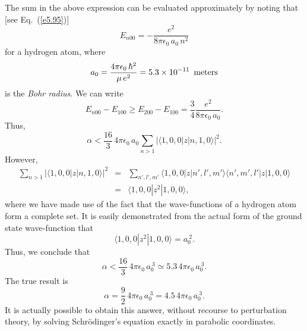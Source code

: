The sum in the above expression can be evaluated approximately by noting that
[see Eq.~(\ref{e5.95})]
\begin{equation}
E_{n00} = - \frac{e^2}{8\pi\epsilon_0\, a_0\,n^2} 
\end{equation}
for a hydrogen atom,
where
\begin{equation}
a_0 = \frac{4\pi \epsilon_0 \,\hbar^2}{\mu \,e^2} = 5.3\times 10^{-11}\,\,\,
{\rm meters}
\end{equation}
is the {\em Bohr radius}. We can write
\begin{equation}
E_{n00}-E_{100} \geq E_{200} - E_{100} = \frac{3}{4}
 \frac{e^2}{8\pi\epsilon_0\, a_0}.
\end{equation}
Thus, 
\begin{equation}
\alpha < \frac{16}{3}\, 4\pi \epsilon_0\, a_0  \sum_{n>1} 
|\langle 1,0,0|z|n,1,0\rangle|^2.
\end{equation}
However,
\begin{eqnarray}
\sum_{n>1} 
|\langle 1,0,0|z|n,1,0\rangle|^2& =& \sum_{n',l',m'}
\langle 1,0,0|z|n',l',m'\rangle\langle n',m',l'|z|1,0,0\rangle \nonumber\\[0.5ex]
&=& \langle 1,0,0|z^2|1,0,0\rangle,
\end{eqnarray}
where we have made use of the fact that the wave-functions of a hydrogen atom
form a complete set. It is easily demonstrated from the 
actual form of the ground state wave-function
that
\begin{equation}
\langle 1,0,0|z^2|1,0,0\rangle = a_0^{~2}.
\end{equation}
Thus, we conclude that
\begin{equation}
\alpha <  \frac{16}{3} \,4\pi \epsilon_0\, a_0^{~3} \simeq 5.3\,4\pi \epsilon_0 \,a_0^{~3}.
\end{equation}
The true result is
\begin{equation}
\alpha = \frac{9}{2}\, 4\pi \epsilon_0\, a_0^{~3} = 4.5\,4\pi \epsilon_0 \,a_0^{~3}.
\end{equation}
It is actually possible to obtain this answer, without recourse to perturbation
theory, by solving Schr\"{o}dinger's equation exactly in parabolic coordinates.

